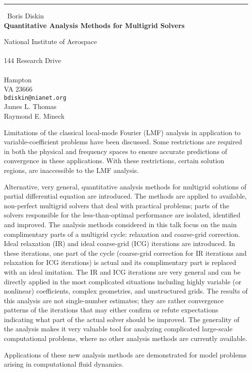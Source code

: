 \documentclass{report}
\begin{document}
\begin{center}
\rule{6in}{1pt} \
{\large Boris Diskin \\
{\bf Quantitative Analysis Methods for Multigrid Solvers}}

National Institute of Aerospace \\ \\ 144 Research Drive \\ \\ Hampton \\ VA 23666
\\
{\tt bdiskin@nianet.org}\\
James L. Thomas\\
Raymond E. Mineck\end{center}


Limitations of the classical local-mode Fourier (LMF) analysis in application
to variable-coefficient problems have been discussed. Some restrictions
are required in both the
physical and frequency spaces to ensure accurate
predictions of convergence in these applications. With these
restrictions, certain solution regions,
are inaccessible to the LMF analysis.


Alternative, very general, quantitative analysis methods for
multigrid solutions of partial differential equation are
introduced.
The methods are applied to available, non-perfect multigrid solvers
that deal with practical problems;
parts of the solvers responsible for the less-than-optimal performance
are isolated, identified and improved.
The analysis methods considered in this talk focus
on the main complimentary parts
of a multigrid cycle: relaxation and coarse-grid correction.
Ideal relaxation (IR) and ideal coarse-grid (ICG) iterations
are introduced. In these iterations,
one part of the cycle (coarse-grid correction for IR iterations
and relaxation for ICG iterations) is actual
and its complimentary part is
replaced with an ideal imitation.
The IR and ICG iterations are very general and can be directly applied
in the most complicated situations including highly variable
(or nonlinear) coefficients,
complex geometries, and unstructured grids.
The results of this analysis
are not single-number estimates;
they are rather convergence patterns of the iterations
that may either confirm or refute expectations indicating
what part of the actual solver should be improved.
The generality of the analysis
makes it very valuable tool for analyzing
complicated large-scale computational problems, where no other
analysis methods are currently available.

Applications of these new analysis methods are demonstrated for model
problems arising in computational fluid dynamics.
\end{document}
